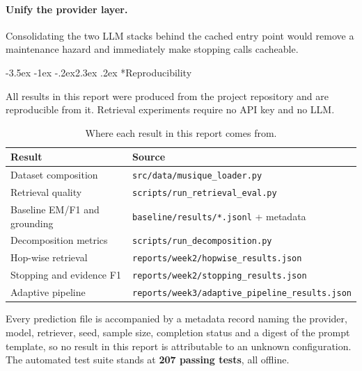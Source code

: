 \documentclass[11pt,a4paper]{article}
\makeatletter
\renewcommand\section{\@startsection{section}{1}{\z@}%
  {-3.5ex \@plus -1ex \@minus -.2ex}{2.3ex \@plus.2ex}%
  {\color{ink}\normalfont\Large\bfseries}}
\newcommand{\code}[1]{\texttt{\small #1}}
\makeatother
\begin{document}
\paragraph{Unify the provider layer.}
Consolidating the two LLM stacks behind the cached entry point would remove a
maintenance hazard and immediately make stopping calls cacheable.

\section*{Reproducibility}

All results in this report were produced from the project repository and are
reproducible from it. Retrieval experiments require no API key and no LLM.

\begin{table}[H]
\centering
\caption{Where each result in this report comes from.}
\begin{tabular}{ll}
\toprule
\textbf{Result} & \textbf{Source} \\
\midrule
Dataset composition          & \code{src/data/musique\_loader.py} \\
Retrieval quality            & \code{scripts/run\_retrieval\_eval.py} \\
Baseline EM/F1 and grounding & \code{baseline/results/*.jsonl} + metadata \\
Decomposition metrics        & \code{scripts/run\_decomposition.py} \\
Hop-wise retrieval           & \code{reports/week2/hopwise\_results.json} \\
Stopping and evidence F1     & \code{reports/week2/stopping\_results.json} \\
Adaptive pipeline          & \code{reports/week3/adaptive\_pipeline\_results.json} \\
\bottomrule
\end{tabular}
\end{table}

Every prediction file is accompanied by a metadata record naming the provider,
model, retriever, seed, sample size, completion status and a digest of the prompt
template, so no result in this report is attributable to an unknown
configuration. The automated test suite stands at \textbf{207 passing tests}, all offline.
\end{document}
